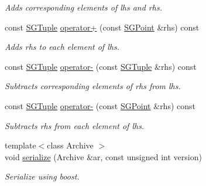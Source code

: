\begin{DoxyCompactItemize}
\begin{DoxyCompactList}\small\item\em Adds corresponding elements of lhs and rhs. \end{DoxyCompactList}\item 
\mbox{\label{classSGTuple_ab7d906640510ff7b5dd39702f363e244}} 
const \hyperlink{classSGTuple}{S\+G\+Tuple} \hyperlink{classSGTuple_ab7d906640510ff7b5dd39702f363e244}{operator+} (const \hyperlink{classSGPoint}{S\+G\+Point} \&rhs) const
\begin{DoxyCompactList}\small\item\em Adds rhs to each element of lhs. \end{DoxyCompactList}\item 
\mbox{\label{classSGTuple_a00d07a5bce8e129032f5cd118bbf234f}} 
const \hyperlink{classSGTuple}{S\+G\+Tuple} \hyperlink{classSGTuple_a00d07a5bce8e129032f5cd118bbf234f}{operator-\/} (const \hyperlink{classSGTuple}{S\+G\+Tuple} \&rhs) const
\begin{DoxyCompactList}\small\item\em Subtracts corresponding elements of rhs from lhs. \end{DoxyCompactList}\item 
\mbox{\label{classSGTuple_a1549de0dc6c3463000119d2b58b78d85}} 
const \hyperlink{classSGTuple}{S\+G\+Tuple} \hyperlink{classSGTuple_a1549de0dc6c3463000119d2b58b78d85}{operator-\/} (const \hyperlink{classSGPoint}{S\+G\+Point} \&rhs) const
\begin{DoxyCompactList}\small\item\em Subtracts rhs from each element of lhs. \end{DoxyCompactList}\item 
\mbox{\label{classSGTuple_a82a8b8ef3ee0f1ae72d49ad98b43bc54}} 
{\footnotesize template$<$class Archive $>$ }\\void \hyperlink{classSGTuple_a82a8b8ef3ee0f1ae72d49ad98b43bc54}{serialize} (Archive \&ar, const unsigned int version)
\begin{DoxyCompactList}\small\item\em Serialize using boost. \end{DoxyCompactList}\end{DoxyCompactItemize}
